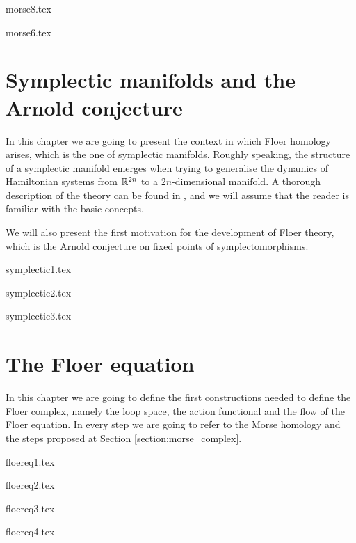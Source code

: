\documentclass[a4paper,11pt]{book}
\begin{document}
{morse8.tex}

 {morse6.tex}

 \chapter{Symplectic manifolds and the Arnold conjecture}
In this chapter we are going to present the context in which Floer homology arises, which is the one of symplectic manifolds. Roughly speaking, the structure of a symplectic manifold emerges when trying to generalise the dynamics of Hamiltonian systems from $\mathbb{R}^{2n}$ to a $2n$-dimensional manifold. A thorough description of the theory can be found in \cite{da2001lectures}, and we will assume that the reader is familiar with the basic concepts.

We will also present the first motivation for the development of Floer theory, which is the Arnold conjecture on fixed points of symplectomorphisms.

{symplectic1.tex}

{symplectic2.tex}

{symplectic3.tex}

 \chapter{The Floer equation}
 In this chapter we are going to define the first constructions needed to define the Floer complex, namely the loop space, the action functional and the flow of the Floer equation. In every step we are going to refer to the Morse homology and the steps proposed at Section \ref{section:morse_complex}.

 {floereq1.tex}

 {floereq2.tex}

 {floereq3.tex}

 {floereq4.tex}
\end{document}
